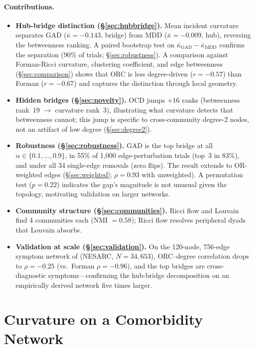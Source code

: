 \documentclass{article}
\begin{document}
\paragraph{Contributions.}
\begin{itemize}
\item \textbf{Hub-bridge distinction (\S\ref{sec:hubbridge}).} Mean incident curvature separates GAD ($\bar\kappa = -0.143$, bridge) from MDD ($\bar\kappa = -0.009$, hub), reversing the betweenness ranking. A paired bootstrap test on $\bar\kappa_{\text{GAD}} - \bar\kappa_{\text{MDD}}$ confirms the separation (90\% of trials; \S\ref{sec:robustness}). A comparison against Forman-Ricci curvature, clustering coefficient, and edge betweenness (\S\ref{sec:comparison}) shows that ORC is less degree-driven ($r = -0.57$) than Forman ($r = -0.67$) and captures the distinction through local geometry.
\item \textbf{Hidden bridges (\S\ref{sec:novelty}).} OCD jumps $+16$ ranks (betweenness rank~19 $\to$ curvature rank~3), illustrating what curvature detects that betweenness cannot; this jump is specific to cross-community degree-2 nodes, not an artifact of low degree (\S\ref{sec:degree2}).
\item \textbf{Robustness (\S\ref{sec:robustness}).} GAD is the top bridge at all $\alpha \in \{0.1, \ldots, 0.9\}$, in 55\% of 1{,}000 edge-perturbation trials (top~3 in 83\%), and under all 34 single-edge removals (zero flips). The result extends to OR-weighted edges (\S\ref{sec:weighted}; $\rho = 0.93$ with unweighted). A permutation test ($p = 0.22$) indicates the gap's magnitude is not unusual given the topology, motivating validation on larger networks.
\item \textbf{Community structure (\S\ref{sec:communities}).} Ricci flow and Louvain find 4 communities each (NMI $= 0.58$); Ricci flow resolves peripheral dyads that Louvain absorbs.
\item \textbf{Validation at scale (\S\ref{sec:validation}).} On the 120-node, 756-edge symptom network of \citet{boschloo2015network} (NESARC, $N = 34{,}653$), ORC--degree correlation drops to $\rho = -0.25$ (vs.\ Forman $\rho = -0.96$), and the top bridges are cross-diagnostic symptoms---confirming the hub-bridge decomposition on an empirically derived network five times larger.
\end{itemize}

\section{Curvature on a Comorbidity Network}
\label{sec:curvature}
\end{document}
